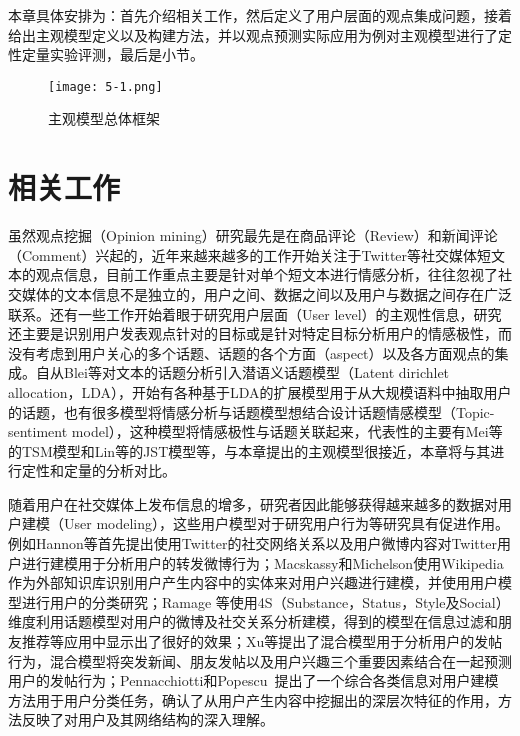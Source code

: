 本章具体安排为：首先介绍相关工作，然后定义了用户层面的观点集成问题，接着给出主观模型定义以及构建方法，并以观点预测实际应用为例对主观模型进行了定性定量实验评测，最后是小节。

\begin{landscape}
\begin{figure*}[htb]
\centering
\texttt{[image: 5-1.png]}
\caption{主观模型总体框架}
\label{fig5-1-1}
\end{figure*}
\end{landscape}

\section{相关工作}
\label{ch5_sec2}
虽然观点挖掘（Opinion mining）研究最先是在商品评论（Review）和新闻评论（Comment）兴起的，近年来越来越多的工作开始关注于Twitter等社交媒体短文本的观点信息，目前工作重点主要是针对单个短文本进行情感分析，往往忽视了社交媒体的文本信息不是独立的，用户之间、数据之间以及用户与数据之间存在广泛联系。还有一些工作开始着眼于研究用户层面（User level）的主观性信息，研究还主要是识别用户发表观点针对的目标或是针对特定目标分析用户的情感极性，而没有考虑到用户关心的多个话题、话题的各个方面（aspect）以及各方面观点的集成。自从Blei等对文本的话题分析引入潜语义话题模型（Latent dirichlet allocation，LDA），开始有各种基于LDA的扩展模型用于从大规模语料中抽取用户的话题，也有很多模型将情感分析与话题模型想结合设计话题情感模型（Topic-sentiment model），这种模型将情感极性与话题关联起来，代表性的主要有Mei等的TSM模型和Lin等的JST模型等，与本章提出的主观模型很接近，本章将与其进行定性和定量的分析对比。

随着用户在社交媒体上发布信息的增多，研究者因此能够获得越来越多的数据对用户建模（User modeling），这些用户模型对于研究用户行为等研究具有促进作用。例如Hannon等首先提出使用Twitter的社交网络关系以及用户微博内容对Twitter用户进行建模用于分析用户的转发微博行为；Macskassy和Michelson使用Wikipedia作为外部知识库识别用户产生内容中的实体来对用户兴趣进行建模，并使用用户模型进行用户的分类研究；Ramage 等使用4S（Substance，Status，Style及Social）维度利用话题模型对用户的微博及社交关系分析建模，得到的模型在信息过滤和朋友推荐等应用中显示出了很好的效果；Xu等提出了混合模型用于分析用户的发帖行为，混合模型将突发新闻、朋友发帖以及用户兴趣三个重要因素结合在一起预测用户的发帖行为；Pennacchiotti和Popescu~提出了一个综合各类信息对用户建模方法用于用户分类任务，确认了从用户产生内容中挖掘出的深层次特征的作用，方法反映了对用户及其网络结构的深入理解。


